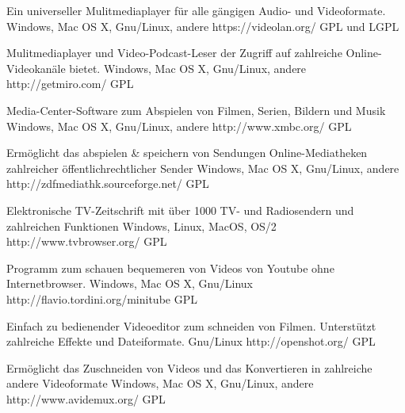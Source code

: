 \documentclass[12pt,a4paper,landscape,twocolumn]{article}
\begin{document}


{Ein universeller Mulitmediaplayer für alle gängigen Audio- und Videoformate.}
{Windows, Mac OS X, Gnu/Linux, andere}
{https://videolan.org/}
{GPL und LGPL}

{Mulitmediaplayer und Video-Podcast-Leser der Zugriff auf zahlreiche Online-Videokanäle bietet.}
{Windows, Mac OS X, Gnu/Linux, andere}
{http://getmiro.com/}
{GPL}

{Media-Center-Software zum Abspielen von Filmen, Serien, Bildern und Musik}
{Windows, Mac OS X, Gnu/Linux, andere}
{http://www.xmbc.org/}
{GPL}

{Ermöglicht das abspielen \& speichern von Sendungen Online-Mediatheken zahlreicher öffentlichrechtlicher Sender}
{Windows, Mac OS X, Gnu/Linux, andere}
{http://zdfmediathk.sourceforge.net/}
{GPL}


\newpage %


{Elektronische TV-Zeitschrift mit über 1000 TV- und Radiosendern und zahlreichen Funktionen}
{Windows, Linux, MacOS, OS/2}
{http://www.tvbrowser.org/}
{GPL}

{Programm zum schauen bequemeren von Videos von Youtube ohne Internetbrowser.}
{Windows, Mac OS X, Gnu/Linux}
{http://flavio.tordini.org/minitube}
{GPL}

{Einfach zu bedienender Videoeditor zum schneiden von Filmen. Unterstützt zahlreiche Effekte und Dateiformate.}
{Gnu/Linux}
{http://openshot.org/}
{GPL}

{Ermöglicht das Zuschneiden von Videos und das Konvertieren in zahlreiche andere Videoformate}
{Windows, Mac OS X, Gnu/Linux, andere}
{http://www.avidemux.org/}
{GPL}
\end{document}
